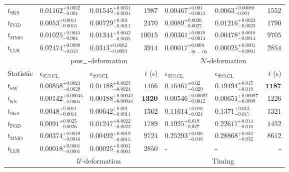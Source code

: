\begin{tabular}{l|llr|llr}
	$t_{\mathrm{SKS}}$ & $0.01162_{-0.004}^{+0.0032}$ & $0.01545_{-0.0031}^{+0.0031}$ & $1987$ & $0.00467_{-0.0013}^{+0.001}$ & $0.0063_{-0.001}^{+0.00088}$ & $1552$ \\
	$t_{\mathrm{FGD}}$ & ${\mathbf{0.0053_{-0.0013}^{+0.0011}}}$ & ${\mathbf{0.00729_{-0.0011}^{+0.001}}}$ & $2470$ & $0.0089_{-0.0027}^{+0.0026}$ & $0.01216_{-0.0023}^{+0.0023}$ & $1790$ \\
	$t_{\mathrm{MMD}}$ & $0.01025_{-0.004}^{+0.0045}$ & $0.01344_{-0.0035}^{+0.0042}$ & $10015$ & $0.00361_{-0.0014}^{+0.0019}$ & $0.00478_{-0.0014}^{+0.0018}$ & $9705$ \\
	$t_{\mathrm{LLR}}$ & $0.02474_{-0.013}^{+0.0098}$ & $0.0313_{-0.0093}^{+0.0082}$ & $3914$ & $0.00017_{-9e-05}^{+0.0001}$ & $0.00025_{-0.0001}^{+0.0001}$ & $2854$ \\
	\toprule
	\multicolumn{1}{c}{} & \multicolumn{3}{c}{$\rm{pow}_{-}$-deformation} & \multicolumn{3}{c}{$\mathcal{N}$-deformation} \\
	Statistic & $\epsilon_{95\%\mathrm{CL}}$ & $\epsilon_{99\%\mathrm{CL}}$ & $t$ (s) & $\epsilon_{95\%\mathrm{CL}}$ & $\epsilon_{99\%\mathrm{CL}}$ & $t$ (s) \\
	\midrule
	$t_{\mathrm{SW}}$ & $0.00858_{-0.0029}^{+0.0024}$ & $0.01188_{-0.0024}^{+0.0023}$ & $1466$ & $0.16467_{-0.029}^{+0.02}$ & $0.19494_{-0.019}^{+0.015}$ & ${\mathbf{1187}}$ \\
	$t_{\overline{\mathrm{KS}}}$ & ${\mathbf{0.00142_{-0.0005}^{+0.00045}}}$ & ${\mathbf{0.00188_{-0.00044}^{+0.00042}}}$ & ${\mathbf{1320}}$ & ${\mathbf{0.00546_{-0.0012}^{+0.00092}}}$ & ${\mathbf{0.00651_{-0.0009}^{+0.00087}}}$ & $1226$ \\
	$t_{\mathrm{SKS}}$ & $0.0048_{-0.0014}^{+0.0011}$ & $0.00642_{-0.0011}^{+0.001}$ & $1562$ & $0.11614_{-0.024}^{+0.016}$ & $0.1371_{-0.017}^{+0.013}$ & $1321$ \\
	$t_{\mathrm{FGD}}$ & $0.0091_{-0.0026}^{+0.0025}$ & $0.01247_{-0.0022}^{+0.0022}$ & $1789$ & $0.1925_{-0.027}^{+0.019}$ & $0.22617_{-0.016}^{+0.014}$ & $1452$ \\
	$t_{\mathrm{MMD}}$ & $0.00374_{-0.0016}^{+0.0019}$ & $0.00492_{-0.0015}^{+0.0019}$ & $9724$ & $0.25293_{-0.048}^{+0.036}$ & $0.28868_{-0.032}^{+0.032}$ & $8612$ \\
	$t_{\mathrm{LLR}}$ & $0.00018_{-0.0001}^{+0.0001}$ & $0.00025_{-0.0001}^{+0.0001}$ & $2850$ & - & - & - \\
	\toprule
	\multicolumn{1}{c}{} & \multicolumn{3}{c}{$\mathcal{U}$-deformation} & \multicolumn{3}{c}{Timing} \\

\end{tabular}

